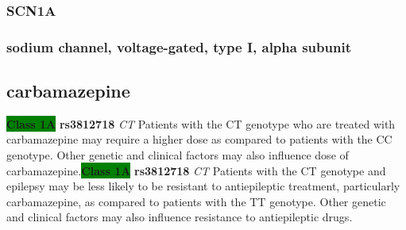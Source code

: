 \documentclass{book}
\begin{document}
\begin{center}
\end{center}










\subsubsection{ SCN1A }
\subsubsection{ sodium channel, voltage-gated, type I, alpha subunit }

\subsection{ carbamazepine }


\begin{center}



\textbf{\colorbox{green} {Class 1A}} \textbf{ rs3812718 } \textit{ CT }
Patients with the CT genotype who are treated with carbamazepine may require a higher dose as compared to patients with the CC genotype. Other genetic and clinical factors may also influence dose of carbamazepine.\textbf{\colorbox{green} {Class 1A}} \textbf{ rs3812718 } \textit{ CT }
Patients with the CT genotype and epilepsy may be less likely to be resistant to antiepileptic treatment, particularly carbamazepine, as compared to patients with the TT genotype. Other genetic and clinical factors may also influence resistance to antiepileptic drugs.

\end{center}
\end{document}
